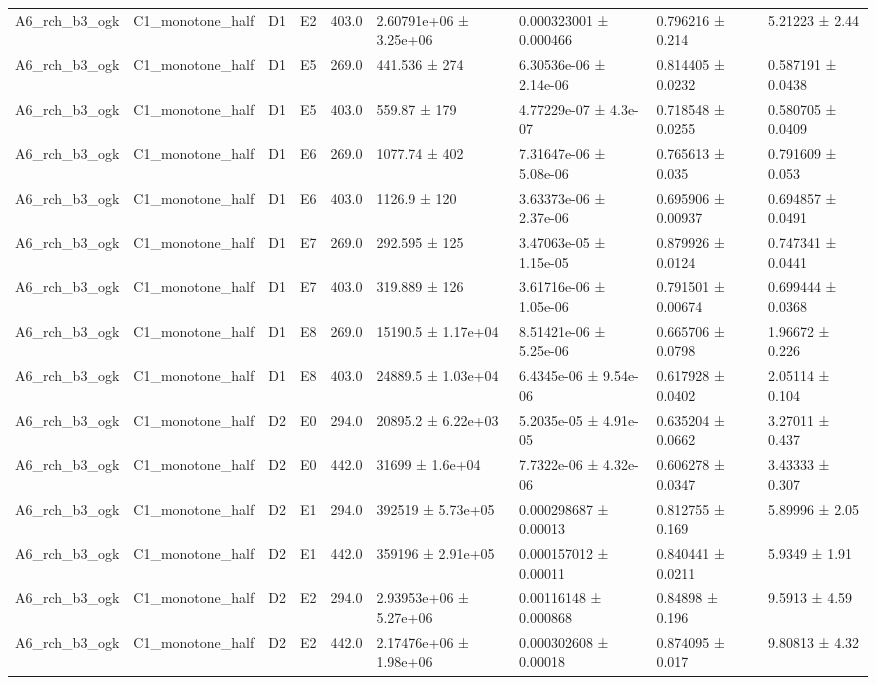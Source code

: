 \begin{table}
\begin{tabular}{lllllllll}
A6\_rch\_b3\_ogk & C1\_monotone\_half & D1 & E2 & 403.0 & 2.60791e+06 ± 3.25e+06 & 0.000323001 ± 0.000466 & 0.796216 ± 0.214 & 5.21223 ± 2.44 \\
A6\_rch\_b3\_ogk & C1\_monotone\_half & D1 & E5 & 269.0 & 441.536 ± 274 & 6.30536e-06 ± 2.14e-06 & 0.814405 ± 0.0232 & 0.587191 ± 0.0438 \\
A6\_rch\_b3\_ogk & C1\_monotone\_half & D1 & E5 & 403.0 & 559.87 ± 179 & 4.77229e-07 ± 4.3e-07 & 0.718548 ± 0.0255 & 0.580705 ± 0.0409 \\
A6\_rch\_b3\_ogk & C1\_monotone\_half & D1 & E6 & 269.0 & 1077.74 ± 402 & 7.31647e-06 ± 5.08e-06 & 0.765613 ± 0.035 & 0.791609 ± 0.053 \\
A6\_rch\_b3\_ogk & C1\_monotone\_half & D1 & E6 & 403.0 & 1126.9 ± 120 & 3.63373e-06 ± 2.37e-06 & 0.695906 ± 0.00937 & 0.694857 ± 0.0491 \\
A6\_rch\_b3\_ogk & C1\_monotone\_half & D1 & E7 & 269.0 & 292.595 ± 125 & 3.47063e-05 ± 1.15e-05 & 0.879926 ± 0.0124 & 0.747341 ± 0.0441 \\
A6\_rch\_b3\_ogk & C1\_monotone\_half & D1 & E7 & 403.0 & 319.889 ± 126 & 3.61716e-06 ± 1.05e-06 & 0.791501 ± 0.00674 & 0.699444 ± 0.0368 \\
A6\_rch\_b3\_ogk & C1\_monotone\_half & D1 & E8 & 269.0 & 15190.5 ± 1.17e+04 & 8.51421e-06 ± 5.25e-06 & 0.665706 ± 0.0798 & 1.96672 ± 0.226 \\
A6\_rch\_b3\_ogk & C1\_monotone\_half & D1 & E8 & 403.0 & 24889.5 ± 1.03e+04 & 6.4345e-06 ± 9.54e-06 & 0.617928 ± 0.0402 & 2.05114 ± 0.104 \\
A6\_rch\_b3\_ogk & C1\_monotone\_half & D2 & E0 & 294.0 & 20895.2 ± 6.22e+03 & 5.2035e-05 ± 4.91e-05 & 0.635204 ± 0.0662 & 3.27011 ± 0.437 \\
A6\_rch\_b3\_ogk & C1\_monotone\_half & D2 & E0 & 442.0 & 31699 ± 1.6e+04 & 7.7322e-06 ± 4.32e-06 & 0.606278 ± 0.0347 & 3.43333 ± 0.307 \\
A6\_rch\_b3\_ogk & C1\_monotone\_half & D2 & E1 & 294.0 & 392519 ± 5.73e+05 & 0.000298687 ± 0.00013 & 0.812755 ± 0.169 & 5.89996 ± 2.05 \\
A6\_rch\_b3\_ogk & C1\_monotone\_half & D2 & E1 & 442.0 & 359196 ± 2.91e+05 & 0.000157012 ± 0.00011 & 0.840441 ± 0.0211 & 5.9349 ± 1.91 \\
A6\_rch\_b3\_ogk & C1\_monotone\_half & D2 & E2 & 294.0 & 2.93953e+06 ± 5.27e+06 & 0.00116148 ± 0.000868 & 0.84898 ± 0.196 & 9.5913 ± 4.59 \\
A6\_rch\_b3\_ogk & C1\_monotone\_half & D2 & E2 & 442.0 & 2.17476e+06 ± 1.98e+06 & 0.000302608 ± 0.00018 & 0.874095 ± 0.017 & 9.80813 ± 4.32 \\

\end{tabular}
\end{table}
